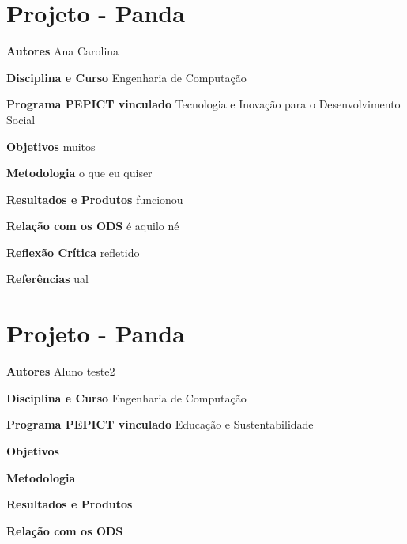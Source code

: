 \documentclass[12pt,openright,oneside,a4paper]{report}
\begin{document}
\section{Projeto - Panda}
\noindent
\textbf{Autores}
Ana Carolina

\vspace{0.7cm}
\noindent
\textbf{Disciplina e Curso}
Engenharia de Computação

\vspace{0.7cm}
\noindent
\textbf{Programa PEPICT vinculado}
Tecnologia e Inovação para o Desenvolvimento Social

\vspace{0.7cm}
\noindent
\textbf{Objetivos}
muitos

\vspace{0.7cm}
\noindent
\textbf{Metodologia}
o que eu quiser

\vspace{0.7cm}
\noindent
\textbf{Resultados e Produtos}
funcionou

\vspace{0.7cm}
\noindent
\textbf{Relação com os ODS}
é aquilo né

\vspace{0.7cm}
\noindent
\textbf{Reflexão Crítica}
refletido

\vspace{0.7cm}
\noindent
\textbf{Referências}
ual

\vspace{0.7cm}
\section{Projeto - Panda}
\noindent
\textbf{Autores}
Aluno teste2

\vspace{0.7cm}
\noindent
\textbf{Disciplina e Curso}
Engenharia de Computação

\vspace{0.7cm}
\noindent
\textbf{Programa PEPICT vinculado}
Educação e Sustentabilidade

\vspace{0.7cm}
\noindent
\textbf{Objetivos}


\vspace{0.7cm}
\noindent
\textbf{Metodologia}


\vspace{0.7cm}
\noindent
\textbf{Resultados e Produtos}


\vspace{0.7cm}
\noindent
\textbf{Relação com os ODS}
\end{document}
